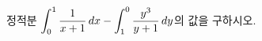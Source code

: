 정적분 $\displaystyle\int_{0}^{1}\dfrac{1}{x+1}\mkern3mu dx-\int_{1}^{0}\dfrac{y^3}{y+1}\mkern3mu dy$의 값을 구하시오.
